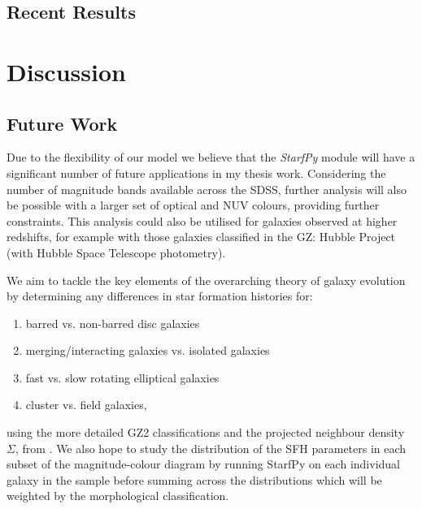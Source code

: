 \documentclass{mn2e}
\begin{document}
\subsection{Recent Results}

%

\section{Discussion}
\subsection{Future Work}\label{future}
Due to the flexibility of our model we believe that the \emph{StarfPy} module will have a significant number of future applications in my thesis work. Considering the number of magnitude bands available across the SDSS, further analysis will also be possible with a larger set of optical and NUV colours, providing further constraints. This analysis could also be utilised for galaxies observed at higher redshifts, for example with those galaxies classified in the GZ: Hubble Project (with Hubble Space Telescope photometry).

We aim to tackle the key elements of the overarching theory of galaxy evolution by determining any differences in star formation histories for:
\begin{enumerate}
\item barred vs. non-barred disc galaxies
\item merging/interacting galaxies vs. isolated galaxies
\item fast vs. slow rotating elliptical galaxies
\item cluster vs. field galaxies,
\end{enumerate}
using the more detailed GZ2 classifications and the projected neighbour density $\Sigma$, from \citet{Baldry06}. We also hope to study the distribution of the SFH parameters in each subset of the magnitude-colour diagram by running StarfPy on each individual galaxy in the sample before summing across the distributions which will be weighted by the morphological classification. 
\end{document}
